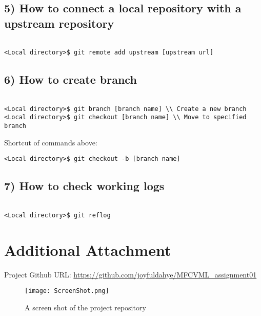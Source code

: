 \documentclass[fleqn,10pt]{wlscirep}
\begin{document}
\subsection*{5) How to connect a local repository with a upstream repository}
\begin{verbatim}

<Local directory>$ git remote add upstream [upstream url]

\end{verbatim}


\subsection*{6) How to create branch}
\begin{verbatim}

<Local directory>$ git branch [branch name] \\ Create a new branch
<Local directory>$ git checkout [branch name] \\ Move to specified branch

\end{verbatim}
Shortcut of commands above:
\begin{verbatim}
<Local directory>$ git checkout -b [branch name]

\end{verbatim}


\subsection*{7) How to check working logs}
\begin{verbatim}

<Local directory>$ git reflog

\end{verbatim}



\section*{Additional Attachment}

Project Github URL: \url{https://github.com/joyfuldahye/MFCVML_assignment01}

\begin{figure}[ht]
\centering
\texttt{[image: ScreenShot.png]}
\caption{A screen shot of the project repository}
\label{fig:screen}
\end{figure}
\end{document}
